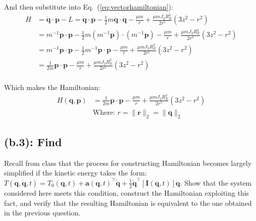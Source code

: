 \documentclass[titlepage]{article}
\begin{document}
And then substitute into Eq.~(\ref{eq:vectorhamiltonian}):
\begin{equation}
	\begin{split}
		H&=\dot{\boldsymbol{q}}\cdot\boldsymbol{p}-L=\dot{\boldsymbol{q}}\cdot\boldsymbol{p}-\frac{1}{2}m\dot{\boldsymbol{q}}\cdot\dot{\boldsymbol{q}}-\frac{\mu m}{r}+\frac{\mu mJ_2R_E^2}{2r^5}\left(3z^2-r^2\right) \\
		&=m^{-1}\boldsymbol{p}\cdot\boldsymbol{p}-\frac{1}{2}m\left(m^{-1}\boldsymbol{p}\right)\cdot\left(m^{-1}\boldsymbol{p}\right)-\frac{\mu m}{r}+\frac{\mu mJ_2R_E^2}{2r^5}\left(3z^2-r^2\right) \\
		&=m^{-1}\boldsymbol{p}\cdot\boldsymbol{p}-\frac{1}{2}m^{-1}\boldsymbol{p}\cdot\boldsymbol{p}-\frac{\mu m}{r}+\frac{\mu mJ_2R_E^2}{2r^5}\left(3z^2-r^2\right) \\
		&=\frac{1}{2m}\boldsymbol{p}\cdot\boldsymbol{p}-\frac{\mu m}{r}+\frac{\mu mJ_2R_E^2}{2r^5}\left(3z^2-r^2\right) \\
	\end{split}
\end{equation}

\begin{mdframed}[linewidth=1pt, innertopmargin=10pt, innerbottommargin=10pt]
	Which makes the Hamiltonian:
	\begin{equation}
		\begin{split}
			H(\boldsymbol{q},\boldsymbol{p})&=\frac{1}{2m}\boldsymbol{p}\cdot\boldsymbol{p}-\frac{\mu m}{r}+\frac{\mu mJ_2R_E^2}{2r^5}\left(3z^2-r^2\right) \\
			&\text{Where: }r=\|\boldsymbol{r}\|_2=\|\boldsymbol{q}\|_2
		\end{split}
	\end{equation}
\end{mdframed}

\newpage

\subsection*{(b.3): Find}

Recall from class that the process for constructing Hamiltonian becomes largely simplified if the kinetic energy takes the form: $T(\boldsymbol{q},\dot{\boldsymbol{q}},t)=T_0(\boldsymbol{q},t)+\boldsymbol{a}(\boldsymbol{q},t)^\top\dot{\boldsymbol{q}}+\frac{1}{2}\dot{\boldsymbol{q}}^\top[\boldsymbol{I}(\boldsymbol{q},t)]\dot{\boldsymbol{q}}$. Show that the system considered here meets this condition, construct the Hamiltonian exploiting this fact, and verify that the resulting Hamiltonian is equivalent to the one obtained in the previous question. \\
\end{document}
